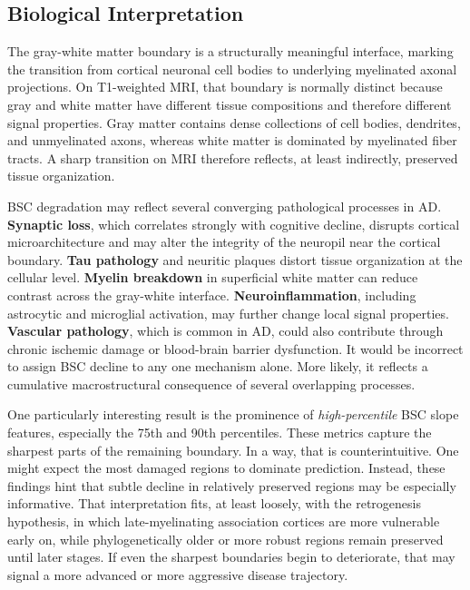 \documentclass[blue]{ludusofficial}
\begin{document}
\subsection{Biological Interpretation}

The gray-white matter boundary is a structurally meaningful interface, marking the transition from cortical neuronal cell bodies to underlying myelinated axonal projections. On T1-weighted MRI, that boundary is normally distinct because gray and white matter have different tissue compositions and therefore different signal properties. Gray matter contains dense collections of cell bodies, dendrites, and unmyelinated axons, whereas white matter is dominated by myelinated fiber tracts. A sharp transition on MRI therefore reflects, at least indirectly, preserved tissue organization.

BSC degradation may reflect several converging pathological processes in AD. \textbf{Synaptic loss}, which correlates strongly with cognitive decline, disrupts cortical microarchitecture and may alter the integrity of the neuropil near the cortical boundary. \textbf{Tau pathology} and neuritic plaques distort tissue organization at the cellular level. \textbf{Myelin breakdown} in superficial white matter can reduce contrast across the gray-white interface. \textbf{Neuroinflammation}, including astrocytic and microglial activation, may further change local signal properties. \textbf{Vascular pathology}, which is common in AD, could also contribute through chronic ischemic damage or blood-brain barrier dysfunction. It would be incorrect to assign BSC decline to any one mechanism alone. More likely, it reflects a cumulative macrostructural consequence of several overlapping processes.

One particularly interesting result is the prominence of \textit{high-percentile} BSC slope features, especially the 75th and 90th percentiles. These metrics capture the sharpest parts of the remaining boundary. In a way, that is counterintuitive. One might expect the most damaged regions to dominate prediction. Instead, these findings hint that subtle decline in relatively preserved regions may be especially informative. That interpretation fits, at least loosely, with the retrogenesis hypothesis, in which late-myelinating association cortices are more vulnerable early on, while phylogenetically older or more robust regions remain preserved until later stages. If even the sharpest boundaries begin to deteriorate, that may signal a more advanced or more aggressive disease trajectory.
\end{document}
